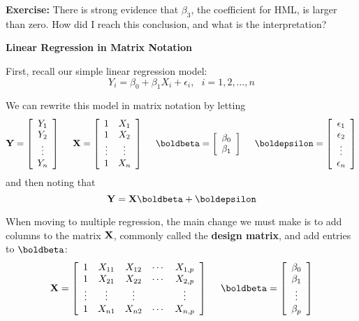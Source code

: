 \documentclass{report}
\begin{document}
\newpage
\textcolor{qcol}{{\bf Exercise:} There is strong evidence that $\beta_3$,
the coefficient for HML, is larger than zero. How did I reach this conclusion,
and what is the interpretation?}



\newpage
\makerule

{\bf \LARGE Linear Regression in Matrix Notation}

First, recall our simple linear regression model:
\[
   Y_i = \beta_0 + \beta_1 X_i + \epsilon_i, \:\:\:i=1,2,\ldots,n
\]

We can rewrite this model in matrix notation by letting
\[
{\bf Y} = \left[\begin{array}{c}Y_1\\Y_2\\ \vdots \\Y_n\end{array}\right]
\:\:\:\:\:\:
{\bf X} = \left[\begin{array}{cc}1&X_1\\1&X_2\\ \vdots & \vdots 
   \\1&X_n\end{array}\right] 
\:\:\:\:\:\:
{\bf \boldbeta} = \left[\begin{array}{c}\beta_0\\\beta_1\end{array}\right]
\:\:\:\:\:\:
{\bf \boldepsilon} = \left[\begin{array}{c}\epsilon_1\\\epsilon_2\\ \vdots \\\epsilon_n\end{array}\right]
\]
and then noting that
\[
   {\bf Y} = {\bf X} \boldbeta + \boldepsilon
\]

When moving to multiple regression, the main change we must make is to add
columns to the matrix ${\bf X}$, commonly called the {\bf design matrix},
and add entries to $\boldbeta$:
\[
{\bf X} = \left[\begin{array}{ccccc}
1 & X_{11} & X_{12} & \cdots & X_{1,p}\\
1 & X_{21} & X_{22} & \cdots & X_{2,p}\\
\vdots & \vdots & \vdots & & \vdots \\
1 & X_{n1} & X_{n2} & \cdots & X_{n,p}\\
\end{array}\right] 
\:\:\:\:\:\:
{\bf \boldbeta} = \left[\begin{array}{c}\beta_0\\\beta_1\\ \vdots\\ \beta_{p}\end{array}\right]
\]
\end{document}
